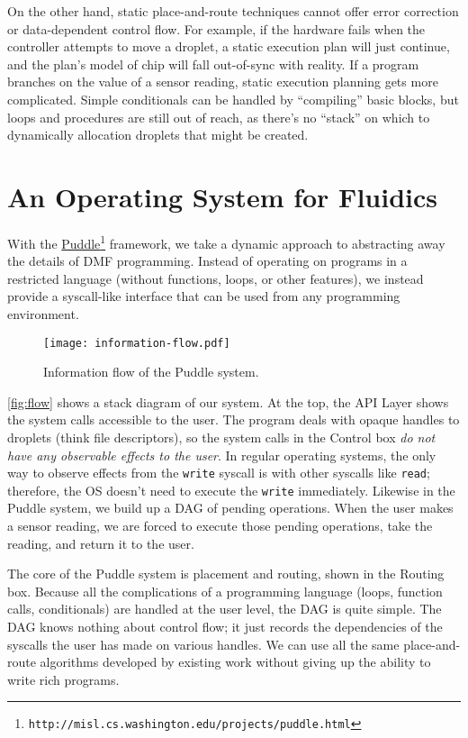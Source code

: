 \documentclass[
  10pt,
  a4paper,
  twocolumn,
]{article}
\def\puddleurl{http://misl.cs.washington.edu/projects/puddle.html}
\begin{document}
On the other hand, static place-and-route techniques cannot offer error correction or data-dependent control flow.
For example, if the hardware fails when the controller attempts to move a droplet, a static execution plan will just continue, and the plan's model of chip will fall out-of-sync with reality.
If a program branches on the value of a sensor reading, static execution planning gets more complicated.
Simple conditionals can be handled by ``compiling'' basic blocks, but loops and procedures are still out of reach, as there's no ``stack'' on which to dynamically allocation droplets that might be created.

\section*{An Operating System for Fluidics}

With the \href{\puddleurl}{Puddle}\footnote{\tt \puddleurl} framework, we take a dynamic approach to abstracting away the details of DMF programming.
Instead of operating on programs in a restricted language (without functions, loops, or other features),
we instead provide a syscall-like interface that can be used from any programming environment.

\begin{figure}
  \centering
  \texttt{[image: information-flow.pdf]}
  \caption{Information flow of the Puddle system.}
  \label{fig:flow}
\end{figure}

\autoref{fig:flow} shows a stack diagram of our system. At the top, the \textsf{API Layer} shows the system calls accessible to the user.
The program deals with opaque handles to droplets (think file descriptors), so the system calls in the \textsf{Control} box \emph{do not have any observable effects to the user}.
In regular operating systems, the only way to observe effects from the \texttt{write} syscall is with other syscalls like \texttt{read};
therefore, the OS doesn't need to execute the \texttt{write} immediately.
Likewise in the Puddle system, we build up a DAG of pending operations.
When the user makes a sensor reading, we are forced to execute those pending operations, take the reading, and return it to the user.

The core of the Puddle system is placement and routing, shown in the \textsf{Routing} box.
Because all the complications of a programming language (loops, function calls, conditionals) are handled at the user level, the DAG is quite simple.
The DAG knows nothing about control flow; it just records the dependencies of the syscalls the user has made on various handles.
We can use all the same place-and-route algorithms developed by existing work without giving up the ability to write rich programs.
\end{document}

